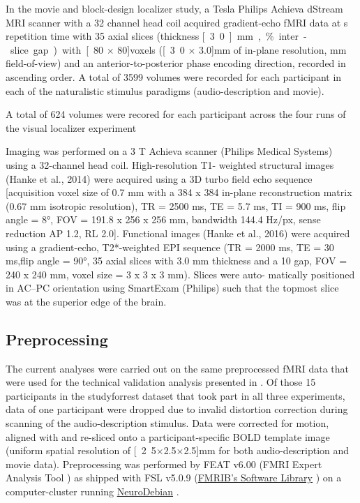 In the movie and block-design localizer study, a \unit[3]{Tesla} Philips Achieva
dStream MRI scanner with a 32 channel head coil acquired gradient-echo fMRI data
at \unit[2]{s} repetition time with
35 axial slices (thickness \unit[3.0]{mm}, \unit[10]{\%} inter-slice gap) with
\unit[80 $\times$ 80]{voxels} (\unit[3.0 $\times$ 3.0]{mm} of in-plane
resolution, \unit[240]{mm} field-of-view) and an anterior-to-posterior phase
encoding direction, recorded in ascending order.
A total of 3599 volumes were recorded for each participant in each of the
naturalistic stimulus paradigms (audio-description and movie).

A total of 624 volumes were recored for each participant across the four runs of
the visual localizer experiment

%
Imaging was performed on a 3 T Achieva
scanner (Philips Medical Systems) using a 32-channel head coil.  High-resolution
T1- weighted structural images (Hanke et al., 2014) were acquired using a 3D
turbo field echo sequence [acquisition voxel size of 0.7 mm with a 384 x 384
in-plane reconstruction matrix (0.67 mm isotropic resolution), TR = 2500 ms, TE
= 5.7 ms, TI = 900 ms, flip angle = 8°, FOV = 191.8 x 256 x 256 mm, bandwidth
144.4 Hz/px, sense reduction AP 1.2, RL 2.0]. Functional images (Hanke et al.,
2016) were acquired using a gradient-echo, T2*-weighted EPI sequence (TR = 2000
ms, TE = 30 ms,flip angle = 90°, 35 axial slices with 3.0 mm thickness and a 10%
gap, FOV = 240 x 240 mm, voxel size = 3 x 3 x 3 mm). Slices were auto- matically
positioned in AC–PC orientation using SmartExam (Philips) such that the topmost
slice was at the superior edge of the brain.


\subsection{Preprocessing}


The current analyses were carried out on the same preprocessed fMRI data
\citep{hanke2016aligned} that were used for the technical validation analysis
presented in \citet{hanke2016simultaneous}.
Of those 15 participants in the studyforrest dataset that took part in all three
experiments, data of one participant were dropped due to invalid distortion
correction during scanning of the audio-description stimulus.
Data were corrected for motion, aligned with and re-sliced onto a
participant-specific BOLD template image \citep{sengupta2016extension} (uniform
spatial resolution of \unit[2.5$\times$2.5$\times$2.5]{mm} for both
audio-description and movie data).
Preprocessing was performed by FEAT v6.00 (FMRI Expert Analysis Tool
\citep{woolrich2001autocorr}) as shipped with FSL v5.0.9
(\href{https://www.fmrib.ox.ac.uk/fsl}{FMRIB's Software Library}
\citep{smith2004fsl}) on a computer-cluster running
\href{http://neuro.debian.net}{NeuroDebian} \citep{halchenko2012open}.




